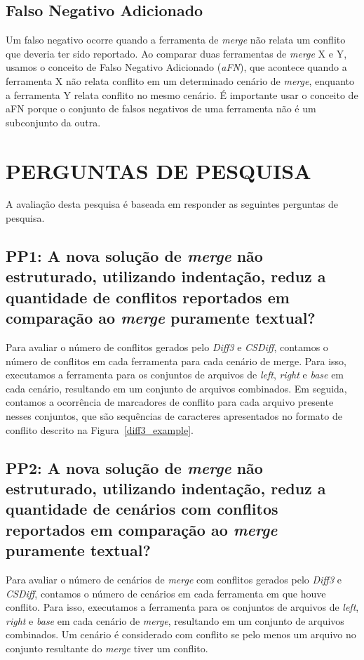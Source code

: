 \subsection{Falso Negativo Adicionado}
Um falso negativo ocorre quando a ferramenta de \emph{merge} não relata um
conflito que deveria ter sido reportado. Ao comparar duas ferramentas de
\emph{merge} X e Y, usamos o conceito de Falso Negativo Adicionado
(\emph{aFN}), que acontece quando a ferramenta X não relata conflito em um
determinado cenário de \emph{merge}, enquanto a ferramenta Y relata conflito no
mesmo cenário. É importante usar
o conceito de aFN porque o conjunto de falsos negativos de uma ferramenta não é
um subconjunto da outra.

\section{PERGUNTAS DE PESQUISA}
A avaliação desta pesquisa é baseada em responder as seguintes perguntas de pesquisa.

\subsection{PP1: A nova solução de \emph{merge} não estruturado, utilizando
	indentação, reduz a quantidade de conflitos reportados em comparação ao
	\emph{merge} puramente textual?}

Para avaliar o número de conflitos gerados pelo \emph{Diff3} e \emph{CSDiff},
contamos o número de conflitos em cada ferramenta para cada cenário de merge.
Para isso, executamos a ferramenta para os conjuntos de arquivos de
\emph{left}, \emph{right} e \emph{base} em cada cenário, resultando em um
conjunto de arquivos combinados. Em seguida, contamos a ocorrência de
marcadores de conflito para cada arquivo presente nesses conjuntos, que são
sequências de caracteres apresentados no formato de conflito descrito na
Figura~\ref{diff3_example}.

\subsection{PP2: A nova solução de \emph{merge} não estruturado, utilizando
	indentação, reduz a quantidade de cenários com conflitos reportados em
	comparação ao \emph{merge} puramente textual?}

Para avaliar o número de cenários de \emph{merge} com conflitos gerados pelo
\emph{Diff3} e \emph{CSDiff}, contamos o número de cenários em cada ferramenta
em que houve conflito. Para isso, executamos a ferramenta para os conjuntos de
arquivos de \emph{left}, \emph{right} e \emph{base} em cada cenário de
\emph{merge}, resultando em um conjunto de arquivos combinados. Um cenário é
considerado com conflito se pelo menos um arquivo no conjunto resultante do
\emph{merge} tiver um conflito.


